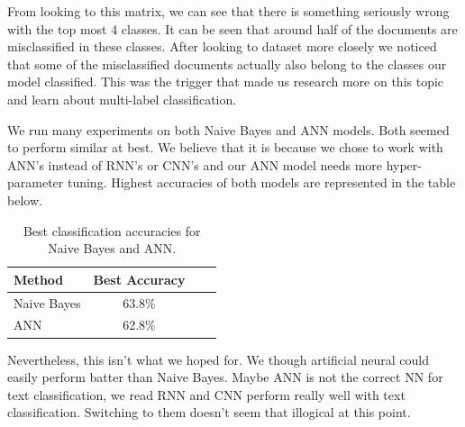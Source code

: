 \documentclass{article}
\begin{document}
From looking to this matrix, we can see that there is something seriously wrong with the top most 4 classes. It can be seen that around half of the documents are misclassified in these classes. After looking to dataset more closely we noticed that some of the misclassified documents actually also belong to the classes our model classified. This was the trigger that made us research more on this topic and learn about multi-label classification.

We run many experiments on both Naive Bayes and ANN models. Both seemed to perform similar at best. We believe that it is because we chose to work with ANN's instead of RNN's or CNN's and our ANN model needs more hyper-parameter tuning. Highest accuracies of both models are represented in the table below.

\begin{table}[htb]
\caption{Best classification accuracies for Naive Bayes and ANN.}
\label{sample-table}
\vskip 0.15in
\begin{center}
\begin{small}
\begin{sc}
\begin{tabular}{lccr}
\toprule
Method & Best Accuracy \\
\midrule
Naive Bayes    & 63.8\% \\
ANN            & 62.8\%\\
\bottomrule
\end{tabular}
\end{sc}
\end{small}
\end{center}
\vskip -0.1in
\end{table}

Nevertheless, this isn't what we hoped for. We though artificial neural could easily perform batter than Naive Bayes. Maybe ANN is not the correct NN for text classification, we read RNN and CNN perform really well with text classification. Switching to them doesn't seem that illogical at this point.



\end{document}
